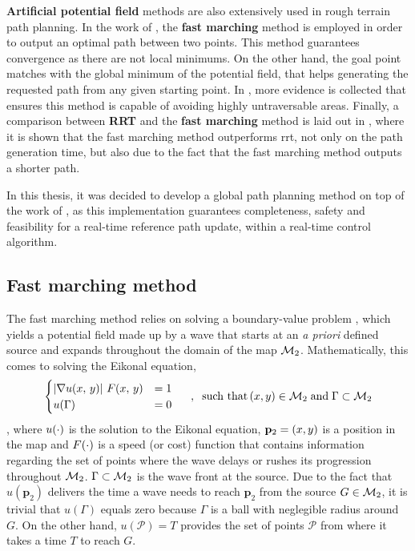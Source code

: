 \textbf{Artificial potential field} methods are also extensively used in rough terrain path planning. In the work of \citet{Amorim2014}, the \textbf{fast marching} method is employed in order to output an optimal path between two points. This method guarantees convergence as there are not local minimums. On the other hand, the goal point matches with the global minimum of the potential field, that helps generating the requested path from any given starting point. In \cite{garridoFMrovers2016}, more evidence is collected that ensures this method is capable of avoiding highly untraversable areas. Finally, a comparison between \textbf{RRT} and the \textbf{fast marching} method is laid out in \cite{garrido2009smooth}, where it is shown that the fast marching method outperforms \acrshort{rrt}, not only on the path generation time, but also due to the fact that the fast marching method outputs a shorter path.

In this thesis, it was decided to develop a global path planning method on top of the work of \citet{Amorim2014}, as this implementation guarantees completeness, safety and feasibility for a real-time reference path update, within a real-time control algorithm.

\subsection{Fast marching method}
\label{section:fastMarching}

The fast marching method relies on solving a boundary-value problem \cite{Sethian1999}, which yields a potential field made up by a wave that starts at an \textit{a priori} defined source and expands throughout the domain of the map $\mathcal{M}_2$. Mathematically, this comes to solving the Eikonal equation,
\begin{equation}
	\begin{cases}
		\left\vert \nabla u(x,\,y) \right\vert \, F(x,\, y) &= 1 \\
		u(\Gamma) &= 0
 	\end{cases}\hspace{5mm} , \hspace{2mm} \text{such that}\,(x, y) \in \mathcal{M}_2\; \text{and} \; \Gamma \subset \mathcal{M}_2
	\label{eq:eikonalEquation}
\end{equation}
, where $u(\cdot)$ is the solution to the Eikonal equation, $\mathbf{p}_2 = (x, y)$ is a position in the map and $F(\cdot)$ is a speed (or cost) function \cite{Ventura2015} that contains information regarding the set of points where the wave delays or  rushes its progression throughout $\mathcal{M}_{2}$. $\Gamma \subset \mathcal{M}_{2}$ is the wave front at the source. Due to the fact that $u(\mathbf{p}_2)$ delivers the time a wave needs to reach $\mathbf{p}_2$ from the source $G \in \mathcal{M}_{2}$, it is trivial that $u(\Gamma)$ equals zero because $\Gamma$ is a ball with neglegible radius around $G$. On the other hand, $u(\mathcal{P}) = T$ provides the set of points $\mathcal{P}$ from where it takes a time $T$ to reach $G$.

